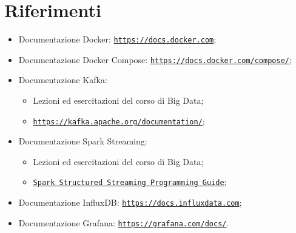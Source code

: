 \documentclass{article}
\begin{document}
\newpage

\section{Riferimenti}
\begin{itemize}
    \item Documentazione Docker: \href{https://docs.docker.com}{\texttt{https://docs.docker.com}};
    \item Documentazione Docker Compose: \href{https://docs.docker.com/compose/}{\texttt{https://docs.docker.com/compose/}};
    \item Documentazione Kafka: 
    \begin{itemize}
    	\item Lezioni ed esercitazioni del corso di Big Data;
    	\item \href{https://kafka.apache.org/documentation/}{\texttt{https://kafka.apache.org/documentation/}};	
    \end{itemize}    
    \item Documentazione Spark Streaming: 
    \begin{itemize}
    	\item Lezioni ed esercitazioni del corso di Big Data;
    	\item \href{https://spark.apache.org/docs/latest/structured-streaming-programming-guide.html}{\texttt{Spark Structured Streaming Programming Guide}};	
    \end{itemize}    
    \item Documentazione InfluxDB: \href{https://docs.influxdata.com}{\texttt{https://docs.influxdata.com}};
    \item Documentazione Grafana: \href{https://grafana.com/docs/}{\texttt{https://grafana.com/docs/}}.
\end{itemize}
\end{document}
